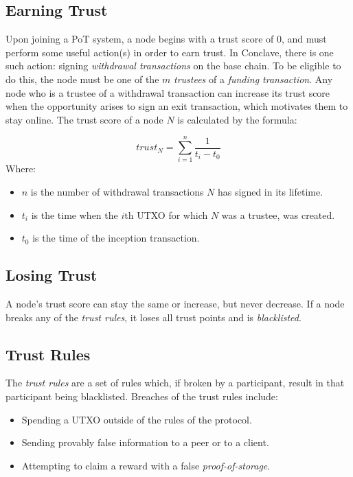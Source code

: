 \documentclass{article}
\begin{document}
\subsection{Earning Trust}

Upon joining a PoT system, a node begins with a trust score of $0$, and must perform some useful action(s) in order to earn trust. In Conclave, there is one such action: signing \textit{withdrawal transactions} on the base chain. To be eligible to do this, the node must be one of the $m$ \textit{trustees} of a \textit{funding transaction}. Any node who is a trustee of a withdrawal transaction can increase its trust score when the opportunity arises to sign an exit transaction, which motivates them to stay online. The trust score of a node $N$ is calculated by the formula:

\[trust_N = \sum_{i=1}^n\frac{1}{t_i - t_0}\]
Where:
\begin{itemize}
	\item $n$ is the number of withdrawal transactions $N$ has signed in its lifetime.
	\item $t_i$ is the time when the $i$th UTXO for which $N$ was a trustee, was created.
	\item $t_0$ is the time of the inception transaction.
\end{itemize}

\subsection{Losing Trust}

A node's trust score can stay the same or increase, but never decrease. If a node breaks any of the \textit{trust rules}, it loses all trust points and is \textit{blacklisted}.

\subsection{Trust Rules}

The \textit{trust rules} are a set of rules which, if broken by a participant, result in that participant being blacklisted. Breaches of the trust rules include:
\begin{itemize}
	\item Spending a UTXO outside of the rules of the protocol.
	\item Sending provably false information to a peer or to a client.
	\item Attempting to claim a reward with a false \textit{proof-of-storage}.
\end{itemize}
	
\end{document}
